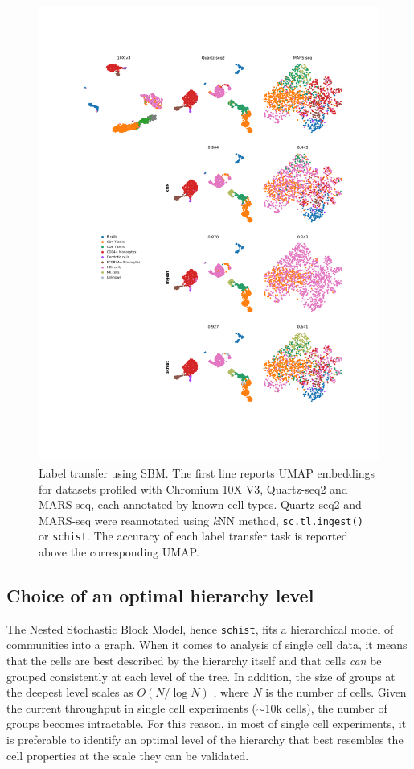 \documentclass[10pt]{article}
\begin{document}
\begin{figure}[H]
\centering
\includegraphics[keepaspectratio,width=1\textwidth,height=\textheight]{Figure_Label_Transfer.pdf}
\vspace*{-40pt}
\caption[]{Label transfer using SBM. The first line reports UMAP embeddings for datasets profiled with Chromium 10X V3, Quartz-seq2 and  MARS-seq, each annotated by known cell types. Quartz-seq2 and MARS-seq were reannotated using \emph{k}NN method, \texttt{sc.tl.ingest() } or \texttt{schist}. The accuracy of each label transfer task is reported above the corresponding UMAP.} \label{Figure_Label_Transfer}
\end{figure}

\subsection*{Choice of an optimal hierarchy level}

The Nested Stochastic Block Model, hence \texttt{schist}, fits a hierarchical model of communities into a graph. When it comes to analysis of single cell data, it means that the cells are best described by the hierarchy itself and that cells \emph{can} be grouped consistently at each level of the tree. In addition, the size of groups at the deepest level scales as $O(N/\log{N})$ \cite{peixoto_2014_h}, where $N$ is the number of cells. Given the current throughput in single cell experiments ($\sim$10k cells), the number of groups becomes intractable. For this reason, in most of single cell experiments, it is preferable to identify an optimal level of the hierarchy that best resembles the cell properties at the scale they can be validated. 
\end{document}
